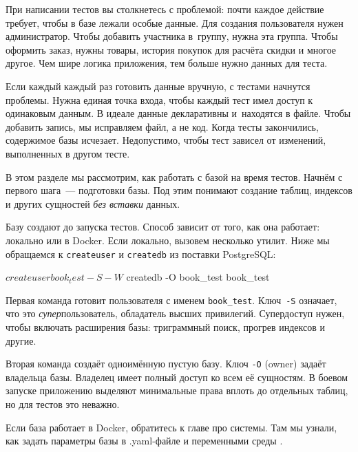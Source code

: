 
При написании тестов вы столкнетесь с проблемой: почти каждое действие требует,
чтобы в базе лежали особые данные. Для создания пользователя нужен
администратор. Чтобы добавить участника в~группу, нужна эта группа. Чтобы
оформить заказ, нужны товары, история покупок для расчёта скидки и многое
другое. Чем шире логика приложения, тем больше нужно данных для теста.

Если каждый каждый раз готовить данные вручную, с тестами начнутся
проблемы. Нужна единая точка входа, чтобы каждый тест имел доступ к одинаковым
данным. В идеале данные декларативны и~находятся в файле. Чтобы добавить запись,
мы исправляем файл, а не код. Когда тесты закончились, содержимое базы
исчезает. Недопустимо, чтобы тест зависел от изменений, выполненных в другом
тесте.

В этом разделе мы рассмотрим, как работать с базой на время тестов. Начнём с
первого шага~--- подготовки базы. Под этим понимают создание таблиц, индексов и
других сущностей \emph{без вставки} данных.


Базу создают до запуска тестов. Способ зависит от того, как она работает:
локально или в Docker. Если локально, вызовем несколько утилит. Ниже мы
обращаемся к \verb|createuser| и \verb|createdb| из поставки PostgreSQL:

\begin{english}
  \begin{bash}
$ createuser book_test -S -W
$ createdb -O book_test book_test
  \end{bash}
\end{english}

Первая команда готовит пользователя с именем \verb|book_test|. Ключ~\verb|-S|
означает, что это \emph{супер}пользователь, обладатель высших
привилегий. Супердоступ нужен, чтобы включать расширения базы: триграммный
поиск, прогрев индексов и другие.

Вторая команда создаёт одноимённую пустую базу. Ключ \verb|-O| (owner) задаёт
владельца базы. Владелец имеет полный доступ ко всем её сущностям. В боевом
запуске приложению выделяют минимальные права вплоть до отдельных таблиц, но для
тестов это неважно.


Если база работает в Docker, обратитесь к главе про системы. Там мы узнали, как
задать параметры базы в .yaml-файле и переменными среды .

